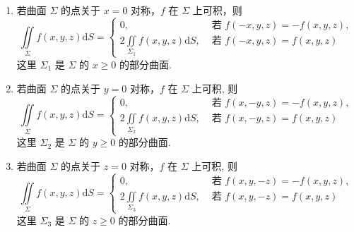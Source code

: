 \begin{theorem}[偶倍奇零性]
    \begin{enumerate}[label=(\arabic{*})]
        \item 若曲面 $ \varSigma $ 的点关于 $ x=0 $ 对称，$f $ 在 $ \varSigma $ 上可积，则
              $$\iint\limits_{\varSigma} f(x, y, z) \mathrm{d} S=\left\{\begin{array}{ll}
                      0,                                                                    & \text { 若 } f(-x, y, z)=-f(x, y, z), \\
                      \displaystyle 2 \iint\limits_{\varSigma_{1}} f(x, y, z) \mathrm{d} S, & \text { 若 } f(-x, y, z)=f(x, y, z)
                  \end{array}\right.$$
              这里 $ \varSigma_{1} $ 是 $ \varSigma $ 的 $ x \geqslant 0 $ 的部分曲面.
        \item 若曲面 $ \varSigma $ 的点关于 $ y=0 $ 对称，$f $ 在 $ \varSigma $ 上可积, 则
              $$\iint\limits_{\varSigma} f(x, y, z) \mathrm{d} S=\left\{\begin{array}{ll}
                      0,                                                                    & \text { 若 } f(x,-y, z)=-f(x, y, z), \\
                      \displaystyle 2 \iint\limits_{\varSigma_{2}} f(x, y, z) \mathrm{d} S, & \text { 若 } f(x,-y, z)=f(x, y, z)
                  \end{array}\right.$$
              这里 $ \varSigma_{2} $ 是 $ \varSigma $ 的 $ y \geqslant 0 $ 的部分曲面.
        \item 若曲面 $ \varSigma $ 的点关于 $ z=0 $ 对称，$f $ 在 $ \varSigma $ 上可积, 则
              $$\iint\limits_{\varSigma} f(x, y, z) \mathrm{d} S=\left\{\begin{array}{ll}
                      0,                                                                    & \text { 若 } f(x, y,-z)=-f(x, y, z), \\
                      \displaystyle 2 \iint\limits_{\varSigma_{3}} f(x, y, z) \mathrm{d} S, & \text { 若 } f(x, y,-z)=f(x, y, z)
                  \end{array}\right.$$
              这里 $ \varSigma_{3} $ 是 $ \varSigma $ 的 $ z \geqslant 0 $ 的部分曲面.
    \end{enumerate}
\end{theorem}

